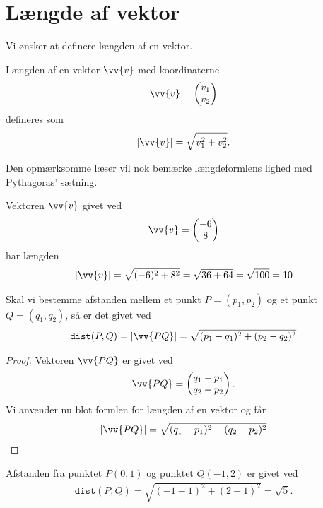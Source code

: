\section*{Længde af vektor}

Vi ønsker at definere længden af en vektor. 
\begin{defn}
	Længden af en vektor $\vv{v}$ med koordinaterne
	\begin{align*}
		\vv{v} = 
		\begin{pmatrix}
			v_1 \\ v_2
		\end{pmatrix}
	\end{align*}
	defineres som
	\begin{align*}
		|\vv{v}| = \sqrt{v_1^2 + v_2^2}.
	\end{align*}
\end{defn}
Den opmærksomme læser vil nok bemærke længdeformlens lighed med Pythagoras' sætning. 

\begin{exa}
	Vektoren $\vv{v}$ givet ved
	\begin{align*}
		\vv{v} = 
		\begin{pmatrix}
			-6 \\ 8
		\end{pmatrix}
	\end{align*}
	har længden 
	\begin{align*}
		|\vv{v}| = \sqrt{(-6)^2+8^2} = \sqrt{36+64} = \sqrt{100} = 10
	\end{align*}
\end{exa}

\begin{setn}
Skal vi bestemme afstanden mellem et punkt $P = (p_1,p_2)$ og et punkt $Q = (q_1,q_2)$, så er det givet ved
\begin{align*}
\texttt{dist}(P,Q) = |\vv{PQ}| = \sqrt{(p_1-q_1)^2+(p_2-q_2)^2}
\end{align*}
\end{setn}
\begin{proof}
Vektoren $\vv{PQ}$ er givet ved
\begin{align*}
\vv{PQ}=\begin{pmatrix}
q_1-p_1\\q_2-p_2
\end{pmatrix}.
\end{align*}
Vi anvender nu blot formlen for længden af en vektor og får
\begin{align*}
|\vv{PQ}| = \sqrt{(q_1-p_1)^2+(q_2-p_2)^2}
\end{align*}
\end{proof}
\begin{exa}
Afstanden fra punktet $P(0,1)$ og punktet $Q(-1,2)$ er givet ved
\begin{align*}
\texttt{dist}(P,Q) = \sqrt{(-1-1)^2+(2-1)^2} = \sqrt{5}.
\end{align*}
\end{exa}


